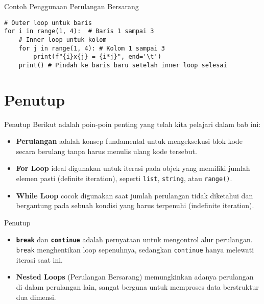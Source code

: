 \documentclass[aspectratio=169, table]{beamer}
\begin{document}
\begin{frame}[fragile]{Contoh Penggunaan Perulangan Bersarang}
\begin{lstlisting}[style=PythonStyle, caption={Kode Python: nested_loop.py}]
# Outer loop untuk baris
for i in range(1, 4):  # Baris 1 sampai 3
    # Inner loop untuk kolom
    for j in range(1, 4): # Kolom 1 sampai 3
        print(f"{i}x{j} = {i*j}", end='\t')
    print() # Pindah ke baris baru setelah inner loop selesai
\end{lstlisting}
\end{frame}

\section{Penutup}
\begin{frame}{Penutup}
    Berikut adalah poin-poin penting yang telah kita pelajari dalam bab ini:
    \begin{itemize}
        \item \textbf{Perulangan} adalah konsep fundamental untuk mengeksekusi blok kode secara berulang tanpa harus menulis ulang kode tersebut.
        \vspace{10pt}
        \item \textbf{For Loop} ideal digunakan untuk iterasi pada objek yang memiliki jumlah elemen pasti (definite iteration), seperti \texttt{list}, \texttt{string}, atau \texttt{range()}.
        \vspace{10pt}
        \item \textbf{While Loop} cocok digunakan saat jumlah perulangan tidak diketahui dan bergantung pada sebuah kondisi yang harus terpenuhi (indefinite iteration).
    \end{itemize}
\end{frame}

\begin{frame}{Penutup}
    \begin{itemize}
        \item \textbf{\texttt{break}} dan \textbf{\texttt{continue}} adalah pernyataan untuk mengontrol alur perulangan. \texttt{break} menghentikan loop sepenuhnya, sedangkan \texttt{continue} hanya melewati iterasi saat ini.
        \vspace{10pt}
        \item \textbf{Nested Loops} (Perulangan Bersarang) memungkinkan adanya perulangan di dalam perulangan lain, sangat berguna untuk memproses data berstruktur dua dimensi.
    \end{itemize}
\end{frame}
\end{document}
